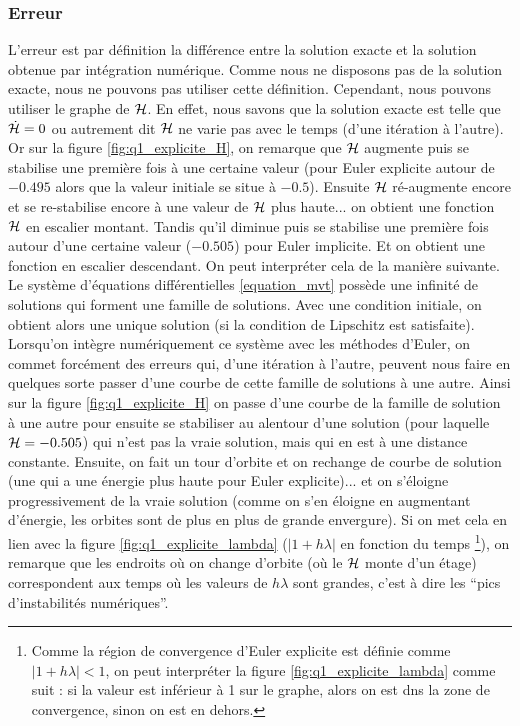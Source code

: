 \subsubsection{Erreur}
L'erreur est par définition la différence entre la solution exacte et la solution obtenue par intégration numérique.
Comme nous ne disposons pas de la solution exacte, nous ne pouvons pas utiliser cette définition. Cependant, nous pouvons utiliser le graphe de $\mathcal{H}$.
En effet, nous savons que la solution exacte est telle que $\dot{\mathcal{H}} = 0$ ou autrement dit $\mathcal{H}$ ne varie pas avec le temps (d'une itération à l'autre).
Or sur la figure \ref{fig:q1_explicite_H}, on remarque que $\mathcal{H}$ augmente puis se stabilise une première fois à une certaine valeur (pour Euler explicite autour de $-0.495$ alors que la valeur initiale se situe à $-0.5$). Ensuite $\mathcal{H}$ ré-augmente encore et se re-stabilise encore à une valeur de $\mathcal{H}$ plus haute... on obtient une fonction $\mathcal{H}$ en escalier montant. Tandis qu'il diminue puis se stabilise une première fois autour d'une certaine valeur ($-0.505$) pour Euler implicite. Et on obtient une fonction en escalier descendant.
On peut interpréter cela de la manière suivante.
Le système d'équations différentielles \ref{equation_mvt} possède une infinité de solutions qui forment une famille de solutions.
Avec une condition initiale, on obtient alors une unique solution (si la condition de Lipschitz est satisfaite).
Lorsqu'on intègre numériquement ce système avec les méthodes d'Euler,
on commet forcément des erreurs qui, d'une itération à l'autre, peuvent
nous faire en quelques sorte passer d'une courbe de cette famille de solutions à une autre.
Ainsi sur la figure \ref{fig:q1_explicite_H} on passe d'une courbe de la famille de solution à une autre pour ensuite se stabiliser au alentour d'une solution (pour laquelle $\mathcal{H}=-0.505$) qui n'est pas la vraie solution,
mais qui en est à une distance constante. Ensuite, on fait un tour d'orbite et on rechange de courbe de solution (une qui a une énergie plus haute pour Euler explicite)... et on s'éloigne progressivement de la vraie solution (comme on s'en éloigne en augmentant d'énergie, les orbites sont de plus en plus de grande envergure). Si on met cela en lien avec la figure \ref{fig:q1_explicite_lambda} ($|1+h\lambda|$ en fonction du temps \footnote{Comme la région de convergence d'Euler explicite est définie comme $|1+h\lambda|<1$, on peut interpréter la figure \ref{fig:q1_explicite_lambda} comme suit : si la valeur est inférieur à 1 sur le graphe, alors on est dns la zone de convergence, sinon on est en dehors.}), on remarque que les endroits où on change d'orbite (où le $\mathcal{H}$ monte d'un étage) correspondent aux temps où les valeurs de $h \lambda $ sont grandes, c'est à dire les ``pics d'instabilités numériques''. \\

